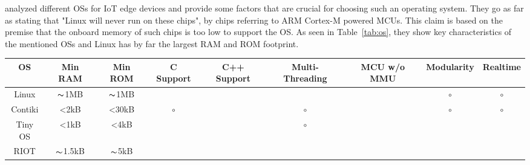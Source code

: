 \cite{milinkovic2015choosing} analyzed different OSs for IoT edge devices and provide some factors that are crucial for choosing such an operating system. They go as far as stating that "Linux will never run on these chips", by chips referring to ARM Cortex-M powered MCUs. This claim is based on the premise that the onboard memory of such chips is too low to support the OS. As seen in Table~\ref{tab:os}, they show key characteristics of the mentioned OSs and Linux has by far the largest RAM and ROM footprint. 

\begin{sidewaystable}[h!]
	\centering
	
	\begin{tabular}{c|c|c|c|c|c|c|c|c}
	OS & Min RAM & Min ROM & C Support & C++ Support & Multi-Threading & MCU w/o MMU & Modularity & Realtime\\
	\hline
	\hline
	Linux & $\thicksim$1MB & $\thicksim$1MB  & \cmark & \cmark & \cmark & \xmark & $\circ$ & $\circ$ \\
	Contiki & <2kB & <30kB  & $\circ$ & \xmark & $\circ$ & \cmark & $\circ$ & $\circ$ \\
	Tiny OS & <1kB & <4kB  & \xmark & \xmark & $\circ$ & \cmark & \xmark & \xmark \\
	RIOT & $\thicksim$1.5kB & $\thicksim$5kB  & \cmark & \cmark & \cmark & \cmark & \cmark & \cmark \\
	\end{tabular}
	\caption{Key characteristics of TinyOS, Contiki, RIOT, and Linux~\cite{baccelli2013riot}}
	\label{tab:os}
\end{sidewaystable}